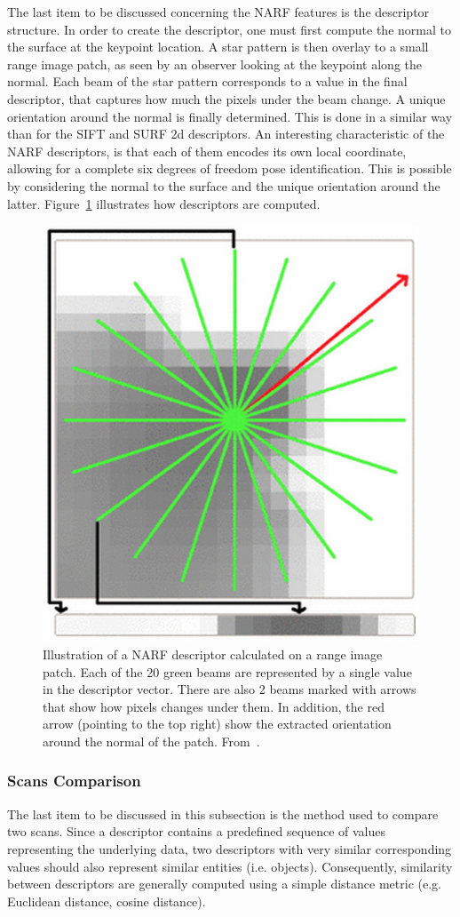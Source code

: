 The last item to be discussed concerning the NARF features is the descriptor structure. In order to create the descriptor, one must first compute the normal to the surface at the keypoint location. A star pattern is then overlay to a small range image patch, as seen by an observer looking at the keypoint along the normal. Each beam of the star pattern corresponds to a value in the final descriptor, that captures how much the pixels under the beam change. A unique orientation around the normal is finally determined. This is done in a similar way than for the SIFT and  SURF \gls*{2d} descriptors. An interesting characteristic of the NARF descriptors, is that each of them encodes its own local coordinate, allowing for a complete six degrees of freedom pose identification. This is possible by considering the normal to the surface and the unique orientation around the latter. Figure~\ref{fig:narf_descriptor} illustrates how descriptors are computed.

\begin{figure}[H]
    \centering
    \includegraphics[width=0.4\linewidth]{img/chap_slam/narf.png}
    \caption{Illustration of a NARF descriptor calculated on a range image patch. Each of the 20 green beams are represented by a single value in the descriptor vector. There are also 2 beams marked with arrows that show how pixels changes under them. In addition, the red arrow (pointing to the top right) show the extracted orientation around the normal of the patch. From~\cite{Steder2011a}.}
    \label{fig:narf_descriptor}
\end{figure}


\subsubsection{Scans Comparison}
\label{ssub:scans_comparison}

The last item to be discussed in this subsection is the method used to compare two scans. Since a descriptor contains a predefined sequence of values representing the underlying data, two descriptors with very similar corresponding values should also represent similar entities (i.e. objects). Consequently, similarity between descriptors are generally computed using a simple distance metric (e.g. Euclidean distance, cosine distance).

